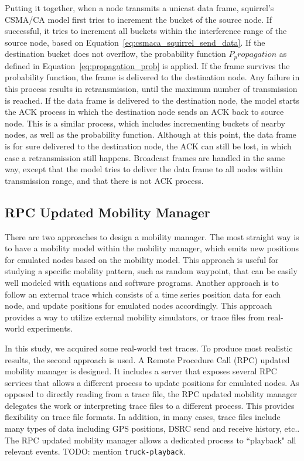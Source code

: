 \documentclass[12pt]{report}
\begin{document}
Putting it together, when a node transmits a unicast data frame, squirrel's CSMA/CA model first tries to increment the bucket of the source node. If successful, it tries to increment all buckets within the interference range of the source node, based on Equation~\ref{eq:csmaca_squirrel_send_data}. If the destination bucket does not overflow, the probability function $P_propagation$ as defined in Equation~\ref{eq:propagation_prob} is applied. If the frame survives the probability function, the frame is delivered to the destination node. Any failure in this process results in retransmission, until the maximum number of transmission is reached. If the data frame is delivered to the destination node, the model starts the ACK process in which the destination node sends an ACK back to source node. This is a similar process, which includes incrementing buckets of nearby nodes, as well as the probability function. Although at this point, the data frame is for sure delivered to the destination node, the ACK can still be lost, in which case a retransmission still happens. Broadcast frames are handled in the same way, except that the model tries to deliver the data frame to all nodes within transmission range, and that there is not ACK process.


\subsection{RPC Updated Mobility Manager}
\label{sec:rpc_mobility_manager}

There are two approaches to design a mobility manager. The most straight way is to have a mobility model within the mobility manager, which emits new positions for emulated nodes based on the mobility model. This approach is useful for studying a specific mobility pattern, such as random waypoint, that can be easily well modeled with equations and software programs. Another approach is to follow an external trace which consists of a time series position data for each node, and update positions for emulated nodes accordingly. This approach provides a way to utilize external mobility simulators, or trace files from real-world experiments.

In this study, we acquired some real-world test traces. To produce most realistic results, the second approach is used. A Remote Procedure Call (RPC) updated mobility manager is designed. It includes a server that exposes several RPC services that allows a different process to update positions for emulated nodes. As opposed to directly reading from a trace file, the RPC updated mobility manager delegates the work or interpreting trace files to a different process. This provides flexibility on trace file formats. In addition, in many cases, trace files include many types of data including GPS positions, DSRC send and receive history, etc.. The RPC updated mobility manager allows a dedicated process to ``playback" all relevant events. TODO: mention \texttt{truck-playback}.
\end{document}
